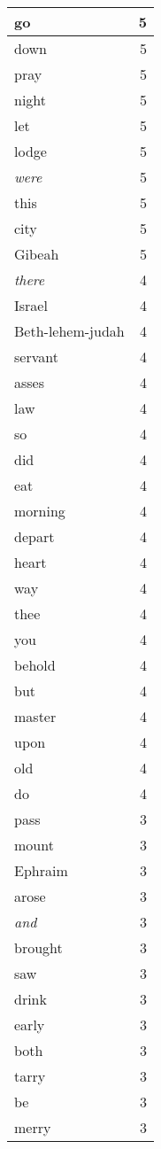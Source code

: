 \begin{center}
\begin{longtable}{l|r}
go & 5 \\ \hline
down & 5 \\ \hline
pray & 5 \\ \hline
night & 5 \\ \hline
let & 5 \\ \hline
lodge & 5 \\ \hline
\emph{were} & 5 \\ \hline
this & 5 \\ \hline
city & 5 \\ \hline
Gibeah & 5 \\ \hline
\emph{there} & 4 \\ \hline
Israel & 4 \\ \hline
Beth-lehem-judah & 4 \\ \hline
servant & 4 \\ \hline
asses & 4 \\ \hline
law & 4 \\ \hline
so & 4 \\ \hline
did & 4 \\ \hline
eat & 4 \\ \hline
morning & 4 \\ \hline
depart & 4 \\ \hline
heart & 4 \\ \hline
way & 4 \\ \hline
thee & 4 \\ \hline
you & 4 \\ \hline
behold & 4 \\ \hline
but & 4 \\ \hline
master & 4 \\ \hline
upon & 4 \\ \hline
old & 4 \\ \hline
do & 4 \\ \hline
pass & 3 \\ \hline
mount & 3 \\ \hline
Ephraim & 3 \\ \hline
arose & 3 \\ \hline
\emph{and} & 3 \\ \hline
brought & 3 \\ \hline
saw & 3 \\ \hline
drink & 3 \\ \hline
early & 3 \\ \hline
both & 3 \\ \hline
tarry & 3 \\ \hline
be & 3 \\ \hline
merry & 3 \\ \hline

\end{longtable}
\end{center}
